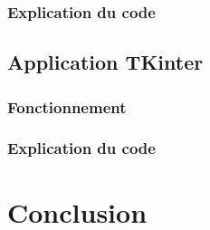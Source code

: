 \subsubsection{Explication du code}

\clearpage	
\subsection{Application TKinter}

\subsubsection{Fonctionnement}

\subsubsection{Explication du code}

\clearpage
\section{Conclusion}


